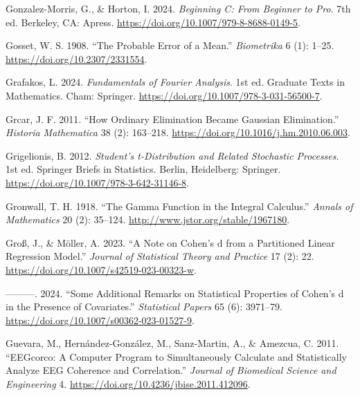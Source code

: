\documentclass[
]{article}
\newlength{\cslhangindent}
\newlength{\cslentryspacingunit} %
\newenvironment{CSLReferences}[2] %
 {%
  \setlength{\parindent}{0pt}
  \ifodd #1
  \let\oldpar\par
  \def\par{\hangindent=\cslhangindent\oldpar}
  \fi
  \setlength{\parskip}{#2\cslentryspacingunit}
 }%
 {}
\begin{document}
\begin{CSLReferences}{1}{0}
\leavevmode{}%
Gonzalez-Morris, G., \& Horton, I. 2024. \emph{{Beginning C: From
Beginner to Pro}}. 7th ed. Berkeley, CA: Apress.
\url{https://doi.org/10.1007/979-8-8688-0149-5}.

\leavevmode{}%
Gosset, W. S. 1908. {``The Probable Error of a Mean.''}
\emph{Biometrika} 6 (1): 1--25. \url{https://doi.org/10.2307/2331554}.

\leavevmode{}%
Grafakos, L. 2024. \emph{Fundamentals of Fourier Analysis}. 1st ed.
Graduate Texts in Mathematics. Cham: Springer.
\url{https://doi.org/10.1007/978-3-031-56500-7}.

\leavevmode{}%
Grcar, J. F. 2011. {``How Ordinary Elimination Became Gaussian
Elimination.''} \emph{Historia Mathematica} 38 (2): 163--218.
\url{https://doi.org/10.1016/j.hm.2010.06.003}.

\leavevmode{}%
Grigelionis, B. 2012. \emph{{Student's t-Distribution and Related
Stochastic Processes}}. 1st ed. Springer Briefs in Statistics. Berlin,
Heidelberg: Springer. \url{https://doi.org/10.1007/978-3-642-31146-8}.

\leavevmode{}%
Gronwall, T. H. 1918. {``The Gamma Function in the Integral Calculus.''}
\emph{Annals of Mathematics} 20 (2): 35--124.
\url{http://www.jstor.org/stable/1967180}.

\leavevmode{}%
Groß, J., \& Möller, A. 2023. {``A Note on Cohen's d from a Partitioned
Linear Regression Model.''} \emph{Journal of Statistical Theory and
Practice} 17 (2): 22. \url{https://doi.org/10.1007/s42519-023-00323-w}.

\leavevmode{}%
---------. 2024. {``Some Additional Remarks on Statistical Properties of
Cohen's d in the Presence of Covariates.''} \emph{Statistical Papers} 65
(6): 3971--79. \url{https://doi.org/10.1007/s00362-023-01527-9}.

\leavevmode{}%
Guevara, M., Hernández-González, M., Sanz-Martin, A., \& Amezcua, C.
2011. {``EEGcorco: A Computer Program to Simultaneously Calculate and
Statistically Analyze EEG Coherence and Correlation.''} \emph{Journal of
Biomedical Science and Engineering} 4.
\url{https://doi.org/10.4236/jbise.2011.412096}.


\end{CSLReferences}
\end{document}
